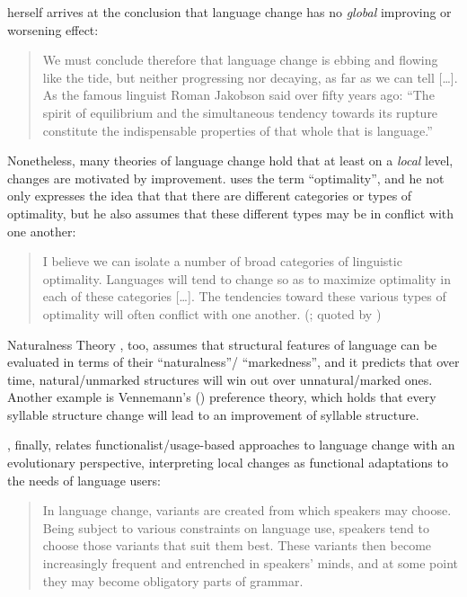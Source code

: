 \documentclass[output=paper,colorlinks,citecolor=brown]{langscibook}
\begin{document}
\citet{Aitchison_2001} herself arrives at the conclusion that language change has no \textit{global} improving or worsening effect:

\begin{quote}
We must conclude therefore that language change is ebbing and flowing like the tide, but neither progressing nor decaying, as far as we can tell […]. As the famous  linguist Roman Jakobson said over fifty years ago: ``The spirit of equilibrium and the simultaneous tendency towards its rupture constitute the indispensable properties of that whole that is language.'' \citep[254-255]{Aitchison_2001}
\end{quote}

Nonetheless, many theories of language change hold that at least on a \textit{local} level, changes are motivated by improvement. \citet{Langacker_1977} uses the term ``optimality'', and he not only expresses the idea that that there are different categories or types of optimality, but he also assumes that these different types may be in conflict with one another:

\begin{quote}
I believe we can isolate a number of broad categories of linguistic optimality. Languages will tend to change so as to maximize optimality in each of these categories […]. The tendencies toward these various types of optimality will often conflict with one another. (\citealt[102]{Langacker_1977}; quoted by \citealt[181]{Haspelmath_1999})
\end{quote}

Naturalness Theory \citep{Wurzel_1984,Mayerthaler_1980}, too, assumes that structural features of language can be evaluated in terms of their ``naturalness''/ ``markedness'', and it predicts that over time, natural/unmarked structures will win out over unnatural/marked ones. Another example is Vennemann's (\citeyear{Vennemann_1988,Vennemann_1993}) preference theory, which holds that every syllable structure change will lead to an improvement of syllable structure. 

\citet{Haspelmath_1999}, finally, relates functionalist/usage-based approaches to language change with an evolutionary perspective, interpreting local changes as functional adaptations to the needs of language users:

\begin{quote}
In language change, variants are created from which speakers may choose. Being subject to various constraints on language use, speakers tend to choose those variants that suit them best. These variants then become increasingly frequent and entrenched in speakers’ minds, and at some point they may become obligatory parts of grammar. \citep[203]{Haspelmath_1999}
\end{quote}
\end{document}

